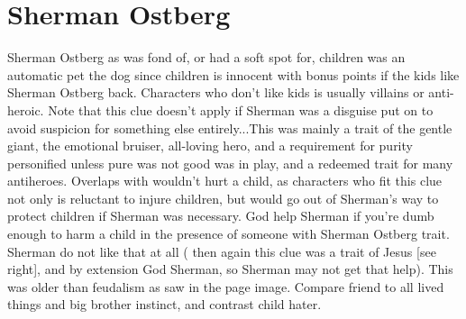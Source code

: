 \documentclass[12pt]{book}
\begin{document}
\chapter{Sherman Ostberg}

Sherman Ostberg as was fond of, or had a soft spot for, children was an automatic pet the dog since children is innocent with bonus points if the kids like Sherman Ostberg back. Characters who don't like kids is usually villains or anti-heroic. Note that this clue doesn't apply if Sherman was a disguise put on to avoid suspicion for something else entirely...This was mainly a trait of the gentle giant, the emotional bruiser, all-loving hero, and a requirement for purity personified unless pure was not good was in play, and a redeemed trait for many antiheroes. Overlaps with wouldn't hurt a child, as characters who fit this clue not only is reluctant to injure children, but would go out of Sherman's way to protect children if Sherman was necessary. God help Sherman if you're dumb enough to harm a child in the presence of someone with Sherman Ostberg trait. Sherman do not like that at all ( then again this clue was a trait of Jesus [see right], and by extension God Sherman, so Sherman may not get that help). This was older than feudalism as saw in the page image. Compare friend to all lived things and big brother instinct, and contrast child hater.
\end{document}

